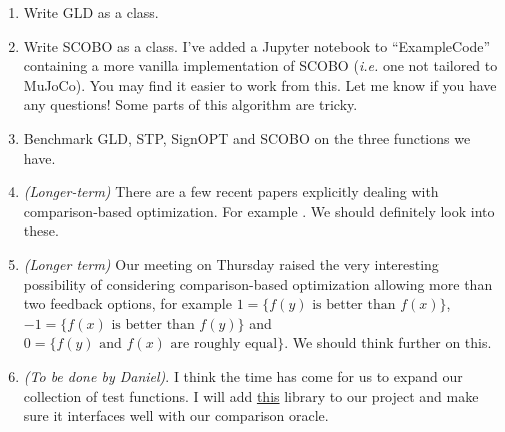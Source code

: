 \documentclass[12pt]{article}
\begin{document}
\begin{enumerate}
	\item Write GLD as a class.
	
	\item Write SCOBO as a class. I've added a Jupyter notebook to ``ExampleCode'' containing a more vanilla implementation of SCOBO ({\em i.e.} one not tailored to MuJoCo). You may find it easier to work from this. Let me know if you have any questions! Some parts of this algorithm are tricky.
	
	\item Benchmark GLD, STP, SignOPT and SCOBO on the three functions we have.
	
	\item  {\em (Longer-term)} There are a few recent papers explicitly dealing with comparison-based optimization. For example \cite{karabag2021smooth,saha2021dueling}. We should definitely look into these. \\
	
	\item {\em (Longer term)} Our meeting on Thursday raised the very interesting possibility of considering comparison-based optimization allowing more than two feedback options, for example $1= \{f(y) \text{ is better than } f(x)\}$, $-1 = \{f(x) \text{ is better than } f(y)\}$ and $0 = \{ f(y) \text{ and } f(x) \text{ are roughly equal}\}$. We should think further on this.
	
	\item {\em (To be done by Daniel)}. I think the time has come for us to expand our collection of test functions. I will add \href{https://github.com/numbbo/coco}{this} library to our project and make sure it interfaces well with our comparison oracle. \\
	
\end{enumerate}



\end{document}
